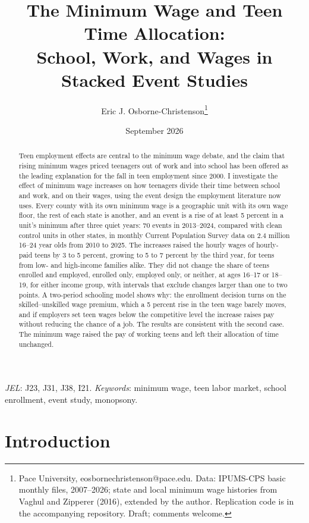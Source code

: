 \documentclass[12pt]{article}
\title{The Minimum Wage and Teen Time Allocation:\\ School, Work, and Wages in Stacked Event Studies}
\author{Eric J. Osborne-Christenson\thanks{Pace University, eosbornechristenson@pace.edu. Data: IPUMS-CPS basic monthly files, 2007--2026; state and local minimum wage histories from Vaghul and Zipperer (2016), extended by the author. Replication code is in the accompanying repository. Draft; comments welcome.}}
\date{September 2026}
\begin{document}
\maketitle

\begin{abstract}
\noindent Teen employment effects are central to the minimum wage debate, and the claim that rising minimum wages priced teenagers out of work and into school has been offered as the leading explanation for the fall in teen employment since 2000. I investigate the effect of minimum wage increases on how teenagers divide their time between school and work, and on their wages, using the event design the employment literature now uses. Every county with its own minimum wage is a geographic unit with its own wage floor, the rest of each state is another, and an event is a rise of at least 5 percent in a unit's minimum after three quiet years: 70 events in 2013--2024, compared with clean control units in other states, in monthly Current Population Survey data on 2.4 million 16--24 year olds from 2010 to 2025. The increases raised the hourly wages of hourly-paid teens by 3 to 5 percent, growing to 5 to 7 percent by the third year, for teens from low- and high-income families alike. They did not change the share of teens enrolled and employed, enrolled only, employed only, or neither, at ages 16--17 or 18--19, for either income group, with intervals that exclude changes larger than one to two points. A two-period schooling model shows why: the enrollment decision turns on the skilled--unskilled wage premium, which a 5 percent rise in the teen wage barely moves, and if employers set teen wages below the competitive level the increase raises pay without reducing the chance of a job. The results are consistent with the second case. The minimum wage raised the pay of working teens and left their allocation of time unchanged.
\end{abstract}

\noindent\textit{JEL}: J23, J31, J38, I21. \textit{Keywords}: minimum wage, teen labor market, school enrollment, event study, monopsony.

\section{Introduction}
\end{document}
